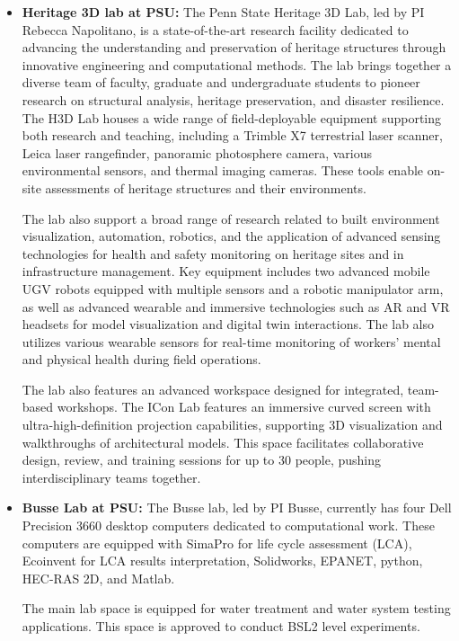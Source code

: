 \documentclass[11pt]{article}
\begin{document}
\begin{itemize}
\item \textbf{Heritage 3D lab at PSU:}
The Penn State Heritage 3D Lab, led by PI Rebecca Napolitano, is a state-of-the-art research facility dedicated to advancing the understanding and preservation of heritage structures through innovative engineering and computational methods. The lab brings together a diverse team of faculty, graduate and undergraduate students to pioneer research on structural analysis, heritage preservation, and disaster resilience. The H3D Lab houses a wide range of field-deployable equipment supporting both research and teaching, including a Trimble X7 terrestrial laser scanner, Leica laser rangefinder, panoramic photosphere camera, various environmental sensors, and thermal imaging cameras. These tools enable on-site assessments of heritage structures and their environments.

The lab also support a broad range of research related to built environment visualization, automation, robotics, and the application of advanced sensing technologies for health and safety monitoring on heritage sites and in infrastructure management. 
Key equipment includes two advanced mobile UGV robots equipped with multiple sensors and a robotic manipulator arm, as well as advanced wearable and immersive technologies such as AR and VR headsets for model visualization and digital twin interactions.
The lab also utilizes various wearable sensors for real-time monitoring of workers' mental and physical health during field operations.

The lab also features an advanced workspace designed for integrated, team-based workshops. The ICon Lab features an immersive curved screen with ultra-high-definition projection capabilities, supporting 3D visualization and walkthroughs of architectural models. This space facilitates collaborative design, review, and training sessions for up to 30 people, pushing interdisciplinary teams together.

\item \textbf{Busse Lab at PSU:}
The Busse lab, led by PI Busse, currently has four Dell Precision 3660 desktop computers dedicated to computational work. These computers are equipped with SimaPro for life cycle assessment (LCA), Ecoinvent for LCA results interpretation, Solidworks, EPANET, python, HEC-RAS 2D, and Matlab. 

The main lab space is equipped for water treatment and water system testing applications. This space is approved to conduct BSL2 level experiments. 


\end{itemize}
\end{document}
